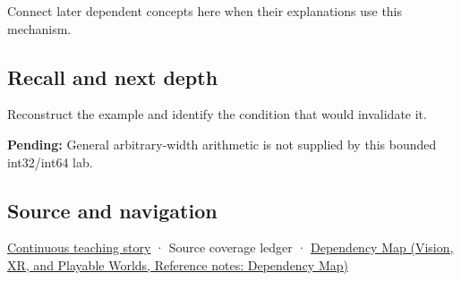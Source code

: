 \hypertarget{appendix-3333db47830f-used-by}{}

Connect later dependent concepts here when their explanations use this mechanism.

\subsection{Recall and next depth}\label{appendix-3333db47830f-recall-and-next-depth}

\hypertarget{appendix-3333db47830f-recall-and-next-depth}{}

Reconstruct the example and identify the condition that would invalidate it.

\textbf{Pending:} General arbitrary-width arithmetic is not supplied by this bounded int32/int64 lab.

\subsection{Source and navigation}\label{appendix-3333db47830f-source-and-navigation}

\hypertarget{appendix-3333db47830f-source-and-navigation}{}

\hyperref[01-foundations-i-ch001-choosing-what-information-to-keep]{Continuous teaching story} · {Source coverage ledger} · \href{../07-Vision-XR-and-Playable-Worlds/main.pdf\#nameddest=appendix-4ad47bdd269a}{Dependency Map (Vision, XR, and Playable Worlds, Reference notes: Dependency Map)}
